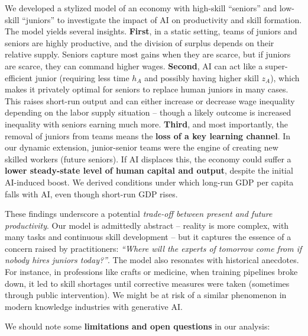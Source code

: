 \documentclass[12pt]{article}
\begin{document}
We developed a stylized model of an economy with high-skill ``seniors''
and low-skill ``juniors'' to investigate the impact of AI on
productivity and skill formation. The model yields several insights.
\textbf{First}, in a static setting, teams of juniors and seniors are
highly productive, and the division of surplus depends on their relative
supply. Seniors capture most gains when they are scarce, but if juniors
are scarce, they can command higher wages. \textbf{Second}, AI can act
like a super-efficient junior (requiring less time \(h_A\) and possibly
having higher skill \(z_A\)), which makes it privately optimal for
seniors to replace human juniors in many cases. This raises short-run
output and can either increase or decrease wage inequality depending on
the labor supply situation -- though a likely outcome is increased
inequality with seniors earning much more. \textbf{Third}, and most
importantly, the removal of juniors from teams means the \textbf{loss of
a key learning channel}. In our dynamic extension, junior-senior teams
were the engine of creating new skilled workers (future seniors). If AI
displaces this, the economy could suffer a \textbf{lower steady-state
level of human capital and output}, despite the initial AI-induced
boost. We derived conditions under which long-run GDP per capita falls
with AI, even though short-run GDP rises.

These findings underscore a potential \emph{trade-off between present
and future productivity}. Our model is admittedly abstract -- reality is
more complex, with many tasks and continuous skill development -- but it
captures the essence of a concern raised by practitioners: \emph{``Where
will the experts of tomorrow come from if nobody hires juniors
today?''}. The model also resonates with historical anecdotes. For
instance, in professions like crafts or medicine, when training
pipelines broke down, it led to skill shortages until corrective
measures were taken (sometimes through public intervention). We might be
at risk of a similar phenomenon in modern knowledge industries with
generative AI.

We should note some \textbf{limitations and open questions} in our
analysis:
\end{document}
